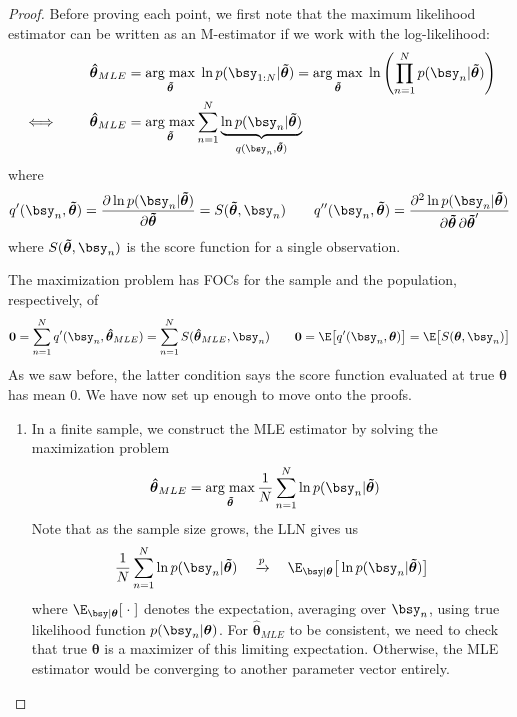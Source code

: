 \documentclass[12pt]{article}
\theoremstyle{plain}
\theoremstyle{definition}
\theoremstyle{remark}
\newcommand{\bstheta}{\boldsymbol{\theta}}
\newcommand{\bshattheta}{\boldsymbol{\hat{\theta}}}
\newcommand{\bstildetheta}{\boldsymbol{\tilde{\theta}}}
\renewcommand{\bso}{\boldsymbol{0}}
\DeclareMathOperator*{\argmax}{arg\;max}
\newcommand{\pto}{\xrightarrow{p}}
\newcommand{\sumnN}{\sum^N_{n=1}}
\newcommand{\prodnN}{\prod^N_{n=1}}
\begin{document}
\begin{proof}
Before proving each point, we first note that the maximum likelihood
estimator can be written as an M-estimator if we work with the
log-likelihood:
\begin{align*}
  \bshattheta_{MLE}
  &=
  \argmax_{\bstildetheta} \; \ln p(\bsy_{1:N}|\bstildetheta)
  =
  \argmax_{\bstildetheta} \;
  \ln\left(\prodnN p(\bsy_n|\bstildetheta)\right)
  \\
  \iff\qquad
  \bshattheta_{MLE}
  &=
  \argmax_{\bstildetheta}
  \sumnN
  \underbrace{%
  \ln p(\bsy_{n}|\bstildetheta)
  }_{q(\bsy_n,\bstildetheta)}
\end{align*}
where
\begin{align*}
  q'(\bsy_n,\bstildetheta)
  =
  \frac{\partial \ln p(\bsy_n|\bstildetheta)}{\partial \bstildetheta}
  = S(\bstildetheta,\bsy_n)
  \qquad
  q''(\bsy_n,\bstildetheta)
  =
  \frac{\partial^2 \ln p(\bsy_n|\bstildetheta)}{%
    \partial\bstildetheta\,\partial\bstildetheta'}
\end{align*}
where $S(\bstildetheta,\bsy_n)$ is the score function for a single
observation.

The maximization problem has FOCs for the sample and the population,
respectively, of
\begin{align*}
  \bso = \sumnN q'(\bsy_n,\bshattheta_{MLE})
  =
  \sumnN S(\bshattheta_{MLE},\bsy_n)
  \qquad
  \bso
  = \E\big[q'(\bsy_n,\bstheta)\big]
  = \E\big[S(\bstheta,\bsy_n)\big]
\end{align*}
As we saw before, the latter condition says the score function
evaluated at true $\bstheta$ has mean 0.
\clearpage
We have now set up enough to move onto the proofs.
\begin{enumerate}[label=(\roman*)]
  \item
    In a finite sample, we construct the MLE estimator by solving the
    maximization problem
    \begin{align*}
      \bshattheta_{MLE}
      &=
      \argmax_{\bstildetheta}
      \frac{1}{N}
      \sumnN \ln p(\bsy_{n}|\bstildetheta)
    \end{align*}
    Note that as the sample size grows, the LLN gives us
    \begin{align*}
      \frac{1}{N} \sumnN \ln p(\bsy_n|\bstildetheta)
      \quad\pto\quad
      \E_{\bsy|\bstheta}\big[\ln p(\bsy_n|\bstildetheta)\big]
    \end{align*}
    where $\E_{\bsy|\bstheta}[\;\cdot\;]$ denotes the expectation,
    averaging over $\bsy_n$, using true likelihood function
    $p(\bsy_n|\bstheta)$.
    For $\bshattheta_{MLE}$ to be consistent, we need to check that
    true $\bstheta$ is a maximizer of this limiting expectation.
    Otherwise, the MLE estimator would be converging to another
    parameter vector entirely.


\end{enumerate}
\end{proof}
\end{document}
